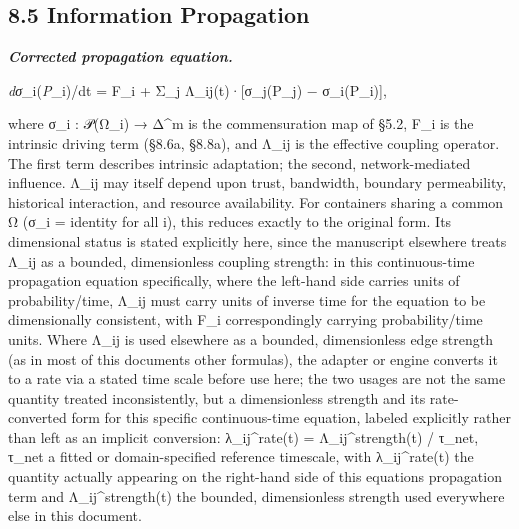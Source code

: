 \documentclass[
]{article}
\begin{document}
\hypertarget{information-propagation}{%
\subsection{8.5 Information Propagation}\label{information-propagation}}

\emph{\textbf{Corrected propagation equation.}}

\emph{dσ}\_i(\emph{P}\_i)/dt = F\_i + Σ\_j Λ\_ij(t)·{[}σ\_j(P\_j) −
σ\_i(P\_i){]},

where σ\_i : 𝒫(Ω\_i) → Δ\^{}m is the commensuration map of §5.2, F\_i is
the intrinsic driving term (§8.6a, §8.8a), and Λ\_ij is the effective
coupling operator. The first term describes intrinsic adaptation; the
second, network-mediated influence. Λ\_ij may itself depend upon trust,
bandwidth, boundary permeability, historical interaction, and resource
availability. For containers sharing a common Ω (σ\_i = identity for all
i), this reduces exactly to the original form. Its dimensional status is
stated explicitly here, since the manuscript elsewhere treats Λ\_ij as a
bounded, dimensionless coupling strength: in this continuous-time
propagation equation specifically, where the left-hand side carries
units of probability/time, Λ\_ij must carry units of inverse time for
the equation to be dimensionally consistent, with F\_i correspondingly
carrying probability/time units. Where Λ\_ij is used elsewhere as a
bounded, dimensionless edge strength (as in most of this
document\textquotesingle s other formulas), the adapter or engine
converts it to a rate via a stated time scale before use here; the two
usages are not the same quantity treated inconsistently, but a
dimensionless strength and its rate-converted form for this specific
continuous-time equation, labeled explicitly rather than left as an
implicit conversion: λ\_ij\^{}rate(t) = Λ\_ij\^{}strength(t) / τ\_net,
τ\_net a fitted or domain-specified reference timescale, with
λ\_ij\^{}rate(t) the quantity actually appearing on the right-hand side
of this equation\textquotesingle s propagation term and
Λ\_ij\^{}strength(t) the bounded, dimensionless strength used everywhere
else in this document.
\end{document}
